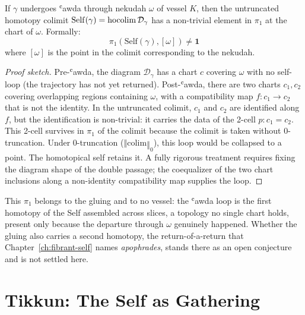 \begin{theorem}\label{thm:awda-enrich}
If $\gamma$ undergoes ʿawda through nekudah $\omega$ of vessel $K$, then the untruncated homotopy colimit $\mathrm{Self}(\gamma) = \operatorname{hocolim} \mathcal{D}_\gamma$ has a non-trivial element in $\pi_1$ at the chart of $\omega$. Formally:
\[
\pi_1(\mathrm{Self}(\gamma), [\omega]) \neq \mathbf{1}
\]
where $[\omega]$ is the point in the colimit corresponding to the nekudah.
\end{theorem}
\begin{proof}[Proof sketch]
Pre-ʿawda, the diagram $\mathcal{D}_\gamma$ has a chart $c$ covering $\omega$ with no self-loop (the trajectory has not yet returned). Post-ʿawda, there are two charts $c_1, c_2$ covering overlapping regions containing $\omega$, with a compatibility map $f : c_1 \to c_2$ that is not the identity. In the untruncated colimit, $c_1$ and $c_2$ are identified along $f$, but the identification is non-trivial: it carries the data of the 2-cell $p : c_1 = c_2$. This 2-cell survives in $\pi_1$ of the colimit because the colimit is taken without 0-truncation. Under 0-truncation ($‖\mathrm{colim}‖_0$), this loop would be collapsed to a point. The homotopical self retains it.
A fully rigorous treatment requires fixing the diagram shape of the double passage; the coequalizer of the two chart inclusions along a non-identity compatibility map supplies the loop.
\end{proof}

This $\pi_1$ belongs to the gluing and to no vessel: the ʿawda loop is the first homotopy of the Self assembled across slices, a topology no single chart holds, present only because the departure through $\omega$ genuinely happened. Whether the gluing also carries a second homotopy, the return-of-a-return that Chapter~\ref{ch:fibrant-self} names \emph{apophrades}, stands there as an open conjecture and is not settled here.

\section{Tikkun: The Self as Gathering}
\label{sec:tikkun}


